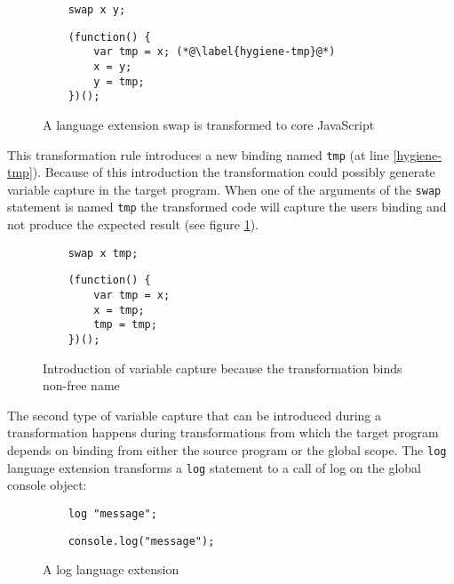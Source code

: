 \begin{figure}[!h]
\begin{minipage}[t]{0.45\textwidth}
	\begin{lstlisting}
	swap x y;
	\end{lstlisting}
\end{minipage}
\hfill
\begin{minipage}[t]{0.45\textwidth}
	\begin{lstlisting}
	(function() {
		var tmp = x; (*@\label{hygiene-tmp}@*)
		x = y;
		y = tmp;
	})();
	\end{lstlisting}
\end{minipage}

\caption{A language extension swap is transformed to core JavaScript}
\end{figure}

This transformation rule introduces a new binding named \lstinline$tmp$ (at line \ref{hygiene-tmp}). Because of this introduction the transformation could possibly generate variable capture in the target program. When one of the arguments of the \lstinline$swap$ statement is named \lstinline$tmp$ the transformed code will capture the users binding and not produce the expected result (see figure \ref{fig:unhygienic}).

\begin{figure}[!h]
\label{fig:unhygienic}
\begin{minipage}[t]{0.45\textwidth}
	\begin{lstlisting}
	swap x tmp;
	\end{lstlisting}
\end{minipage}
\hfill
\begin{minipage}[t]{0.45\textwidth}
	\begin{lstlisting}
	(function() {
		var tmp = x;
		x = tmp;
		tmp = tmp;
	})();
	\end{lstlisting}
\end{minipage}
\caption{Introduction of variable capture because the transformation binds non-free name} \label{fig:unhygienic}
\end{figure}

The second type of variable capture that can be introduced during a transformation happens during transformations from which the target program depends on binding from either the source program or the global scope. The \lstinline$log$ language extension transforms a \lstinline$log$ statement to a call of log on the global console object:

\begin{figure}[!h]
\begin{minipage}[t]{0.45\textwidth}
	\begin{lstlisting}
	log "message";
	\end{lstlisting}
\end{minipage}
\hfill
\begin{minipage}[t]{0.45\textwidth}
	\begin{lstlisting}
	console.log("message");
	\end{lstlisting}
\end{minipage}
\caption{A log language extension}
\end{figure}

